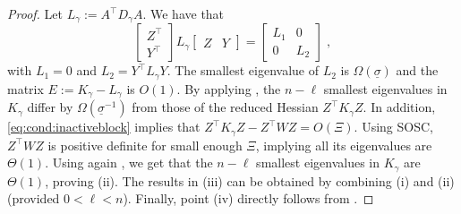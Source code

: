 \begin{proof}
  Let $L_\gamma := A^\top D_\gamma A$.
  We have that
  \begin{equation}
    \begin{bmatrix}
      Z^\top \\ Y^\top
    \end{bmatrix}
    L_\gamma \begin{bmatrix}Z & Y \end{bmatrix}
    = \begin{bmatrix}
      L_1 & 0 \\
      0 & L_2
    \end{bmatrix} \; ,
  \end{equation}
  with $L_1 = 0$ and $L_2 = Y^\top L_\gamma Y$.
  The smallest eigenvalue of $L_2$ is $\Omega(\underline{\sigma})$
  and the matrix $E := K_\gamma - L_\gamma$ is $O(1)$.
  By applying \cite[Theorem 3.1, (ii)]{wright1998ill},
  the $n - \ell$ smallest eigenvalues in $K_\gamma$ differ by
  $\Omega(\underline{\sigma}^{-1})$ from those of the reduced Hessian $Z^\top K_\gamma Z$.
  In addition, \eqref{eq:cond:inactiveblock} implies
  that $Z^\top K_\gamma Z - Z^\top W Z = O(\Xi)$. Using SOSC,
  $Z^\top W Z$ is positive definite for small enough $\Xi$, implying
  all its eigenvalues are $\Theta(1)$. Using again \cite[Lemma 3.1]{wright1998ill},
  we get that the $n-\ell$ smallest eigenvalues in $K_\gamma$ are $\Theta(1)$,
  proving (ii). The results in (iii) can be obtained by combining
  (i) and (ii) (provided $0 < \ell < n$).
  Finally, point (iv) directly follows from \cite[Theorem 3.1 (i)]{wright1998ill}.
\end{proof}

